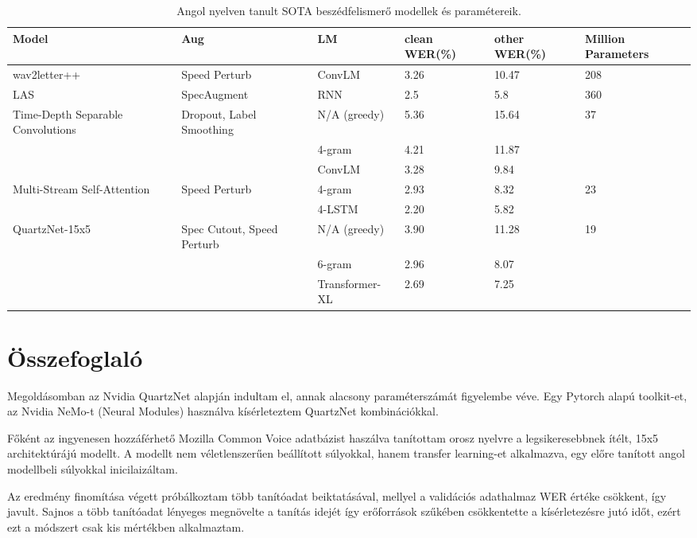 \begin{table}[ht]
	\footnotesize
	\centering
	\begin{tabular}{ p{2cm} p{2cm} p{2.5cm} p{1.5cm} p{1.5cm} p{2cm} }
		\toprule
		\textbf{Model} & \textbf{Aug} & \textbf{LM} & \textbf{clean WER(\%)} & \textbf{other WER(\%)} & \textbf{Million Parameters} \\
		\midrule
		wav2letter++ & Speed Perturb & ConvLM & 3.26 & 10.47 & 208 \\
		\hline
		LAS & SpecAugment & RNN & 2.5 & 5.8 & 360 \\
		\hline
		Time-Depth Separable Convolutions & Dropout, Label Smoothing & N/A (greedy) & 5.36 & 15.64 & 37 \\
		&  & 4-gram & 4.21 & 11.87 &  \\
		&  & ConvLM & 3.28 & 9.84 &  \\
		\hline
		Multi-Stream Self-Attention & Speed Perturb & 4-gram & 2.93 & 8.32 & 23  \\
		&  & 4-LSTM & 2.20 & 5.82 &  \\
		\hline
		QuartzNet-15x5 & Spec Cutout, Speed Perturb & N/A (greedy) & 3.90 & 11.28 & 19 \\
		&  & 6-gram & 2.96 & 8.07 &  \\
		&  & Transformer-XL & 2.69 & 7.25 &  \\
		\bottomrule
	\end{tabular}
	\caption{Angol nyelven tanult SOTA beszédfelismerő modellek és paramétereik.}
\end{table}

\section{Összefoglaló}

Megoldásomban az Nvidia QuartzNet alapján indultam el, annak alacsony paraméterszámát figyelembe véve. Egy Pytorch alapú toolkit-et, az Nvidia NeMo-t (Neural Modules) használva kísérleteztem QuartzNet kombinációkkal.

Főként az ingyenesen hozzáférhető Mozilla Common Voice adatbázist haszálva tanítottam orosz nyelvre a legsikeresebbnek ítélt, 15x5 architektúrájú modellt. A modellt nem véletlenszerűen beállított súlyokkal, hanem transfer learning-et alkalmazva, egy előre tanított angol modellbeli súlyokkal inicilaizáltam.

Az eredmény finomítása végett próbálkoztam több tanítóadat beiktatásával, mellyel a validációs adathalmaz WER értéke csökkent, így javult. Sajnos a több tanítóadat lényeges megnövelte a tanítás idejét így erőforrások szűkében csökkentette a kísérletezésre jutó időt, ezért ezt a módszert csak kis mértékben alkalmaztam.

